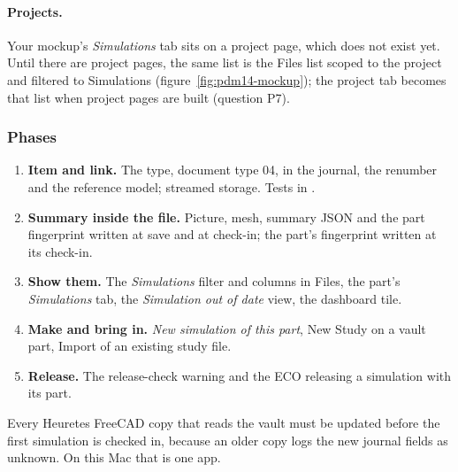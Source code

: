 \paragraph{Projects.} Your mockup's \emph{Simulations} tab sits on a project page, which does not exist yet. Until
there are project pages, the same list is the Files list scoped to the project and filtered to Simulations
(figure~\ref{fig:pdm14-mockup}); the project tab becomes that list when project pages are built (question P7).

\subsubsection*{Phases}
\begin{enumerate}[nosep,label=P\arabic*.]
  \item \textbf{Item and link.} The  type, document type 04,  in the journal, the
        renumber and the reference model; streamed storage. Tests in .
  \item \textbf{Summary inside the file.} Picture, mesh, summary JSON and the part fingerprint written at save and at
        check-in; the part's fingerprint written at its check-in.
  \item \textbf{Show them.} The \emph{Simulations} filter and columns in Files, the part's \emph{Simulations} tab, the
        \emph{Simulation out of date} view, the dashboard tile.
  \item \textbf{Make and bring in.} \emph{New simulation of this part}, New Study on a vault part, Import of an
        existing study file.
  \item \textbf{Release.} The release-check warning and the ECO releasing a simulation with its part.
\end{enumerate}
Every Heuretes FreeCAD copy that reads the vault must be updated before the first simulation is checked in, because an older
copy logs the new journal fields as unknown. On this Mac that is one app.

